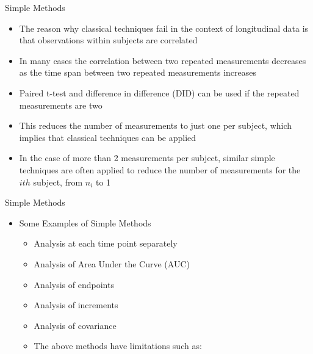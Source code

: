 \documentclass{beamer}
\begin{document}
\begin{frame}{Simple Methods}
\begin{itemize}
	\item The reason why classical techniques fail in the context of longitudinal data is that observations within subjects are correlated
	\item In many cases the correlation between two repeated measurements decreases as the time span between two repeated measurements increases
	\item Paired t-test and difference in difference (DID) can be used if the repeated measurements are two
	\item This reduces the number of measurements to just one per subject, which implies that classical techniques can be applied
	\item In the case of more than 2 measurements per subject, similar simple techniques are often applied to reduce the number of measurements for the $ith$ subject, from $n_i$ to 1
\end{itemize}
\end{frame}


\begin{frame}{Simple Methods}
\begin{itemize}
	\item Some Examples of Simple Methods \vspace{0.25cm}
	\begin{itemize}
\item Analysis at each time point separately \vspace{0.25cm}
\item Analysis of Area Under the Curve (AUC) \vspace{0.25cm}
\item Analysis of endpoints \vspace{0.25cm}
\item Analysis of increments \vspace{0.25cm}
\item Analysis of covariance \vspace{0.25cm}
\item The above methods have limitations such as:
\end{itemize}
\end{itemize}
\end{frame}
\end{document}

